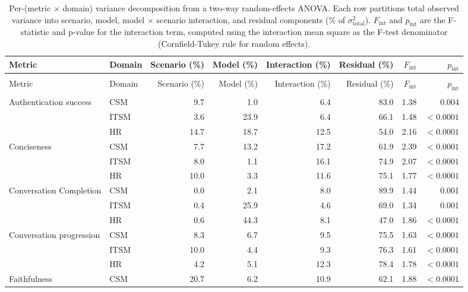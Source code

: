 \begingroup\footnotesize
\begin{longtable}{>{\raggedright\arraybackslash}p{1.8cm}lrrrrrr}
\caption{Per-(metric $\times$ domain) variance decomposition from a two-way random-effects ANOVA. Each row partitions total observed variance into scenario, model, model $\times$ scenario interaction, and residual components (\% of $\sigma^2_\text{total}$). $F_\text{int}$ and $p_\text{int}$ are the F-statistic and p-value for the interaction term, computed using the interaction mean square as the F-test denominator (Cornfield-Tukey rule for random effects).}
\label{tab:icc-interaction} \\
\toprule
Metric & Domain & Scenario (\%) & Model (\%) & Interaction (\%) & Residual (\%) & $F_\text{int}$ & $p_\text{int}$ \\
\midrule
\endfirsthead
\multicolumn{8}{l}{\emph{Table~\ref{tab:icc-interaction} continued from previous page}} \\
\toprule
Metric & Domain & Scenario (\%) & Model (\%) & Interaction (\%) & Residual (\%) & $F_\text{int}$ & $p_\text{int}$ \\
\midrule
\endhead
\midrule \multicolumn{8}{r}{\emph{continued on next page}} \\
\endfoot
\bottomrule
\endlastfoot
Authentication success & CSM & 9.7 & 1.0 & 6.4 & 83.0 & 1.38 & 0.004 \\
 & ITSM & 3.6 & 23.9 & 6.4 & 66.1 & 1.48 & $< 0.0001$ \\
 & HR & 14.7 & 18.7 & 12.5 & 54.0 & 2.16 & $< 0.0001$ \\
\midrule
Conciseness & CSM & 7.7 & 13.2 & 17.2 & 61.9 & 2.39 & $< 0.0001$ \\
 & ITSM & 8.0 & 1.1 & 16.1 & 74.9 & 2.07 & $< 0.0001$ \\
 & HR & 10.0 & 3.3 & 11.6 & 75.1 & 1.77 & $< 0.0001$ \\
\midrule
Conversation Completion & CSM & 0.0 & 2.1 & 8.0 & 89.9 & 1.44 & 0.001 \\
 & ITSM & 0.4 & 25.9 & 4.6 & 69.0 & 1.34 & 0.001 \\
 & HR & 0.6 & 44.3 & 8.1 & 47.0 & 1.86 & $< 0.0001$ \\
\midrule
Conversation progression & CSM & 8.3 & 6.7 & 9.5 & 75.5 & 1.63 & $< 0.0001$ \\
 & ITSM & 10.0 & 4.4 & 9.3 & 76.3 & 1.61 & $< 0.0001$ \\
 & HR & 4.2 & 5.1 & 12.3 & 78.4 & 1.78 & $< 0.0001$ \\
\midrule
Faithfulness & CSM & 20.7 & 6.2 & 10.9 & 62.1 & 1.88 & $< 0.0001$ \\

\end{longtable}
